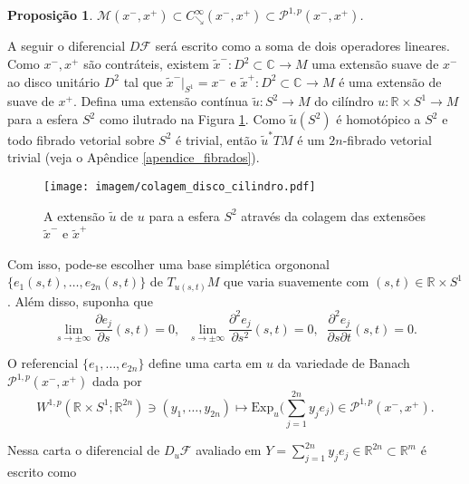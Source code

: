 \documentclass[12pt]{book}
\newtheorem{proposicao}[teorema]{Proposição}
\newcommand{\caminhosdecaimentoexponencial}[2]{C^{\infty}_{\searrow}(#1, #2)}
\newcommand{\caminhosdecaimentoexponencialpadrao}{\caminhosdecaimentoexponencial{x^{-}}{x^{+}}}
\newcommand{\caminhosexponenciaisconectantes}[2]{\mathcal{P}^{1,p}(#1, #2)}
\newcommand{\caminhosexponenciaisconectantespadrao}{\caminhosexponenciaisconectantes{x^{-}}{x^{+}}}
\newcommand{\circulo}{S^{1}}
\newcommand{\complexo}[1]{\mathbb{C}^{#1}}
\newcommand{\diferencialfloer}{D\operadorFloer}
\newcommand{\diferencialfloerponto}[1]{D_{#1}\operadorFloer}
\newcommand{\derivadaparcial}[2]{\frac{\partial #1}{\partial #2}}
\newcommand{\energiafinitaM}{\mathcal{M}}
\newcommand{\energiafinitaMconectante}{\energiafinitaM(x^{-}, x^{+})}
\newcommand{\espacosobolevcontradominio}[2]{W^{1,p}(#1;#2)}
\newcommand{\espacotangenteponto}[2]{T_{#1}#2}
\newcommand{\Exp}{\text{Exp}}
\newcommand{\operadorFloer}{\mathcal{F}}
\newcommand{\pullbackfibradotangente}[2]{#1^{*}T#2}
\newcommand{\pullbackfibradotangenteM}[1]{\pullbackfibradotangente{#1}{M}}
\newcommand{\retacartesianocirculo}{\real{} \times \circulo}
\newcommand{\real}[1]{\mathbb{R}^{#1}}
\begin{document}
	\begin{proposicao}\label{proposicao_cadeia_caminhos_conectantes}
		$\energiafinitaMconectante \subset \caminhosdecaimentoexponencialpadrao \subset  \caminhosexponenciaisconectantespadrao$.
	\end{proposicao}
	
	
	A seguir o diferencial $\diferencialfloer$ será escrito como a soma de dois operadores lineares. Como $x^{-}, x^{+}$ são contráteis, existem $\tilde{x}^{-}:D^{2}\subset \complexo{} \to M$ uma extensão suave de $x^{-}$ ao disco unitário $D^{2}$ tal que  $\tilde{x}^{-}|_{\circulo} = x^{-}$ e $\tilde{x}^{+}:D^{2}\subset \complexo{} \to M$ é uma extensão de suave de $x^{+}$. Defina uma extensão contínua $\tilde{u}:S^{2}\to M$ do cilíndro $u:\retacartesianocirculo\to M$ para a esfera $S^{2}$ como ilutrado na Figura \ref{figura_colagem_disco_cilindro}. Como $\tilde{u}(S^{2})$ é homotópico a $S^{2}$ e todo fibrado vetorial sobre $S^{2}$ é trivial, então $\pullbackfibradotangenteM{\tilde{u}}$ é um $2n$-fibrado vetorial trivial (veja o Apêndice \ref{apendice_fibrados}).
	
	\begin{figure}[!h]
		\centering
		\texttt{[image: imagem/colagem\_disco\_cilindro.pdf]}
		\caption{A extensão $\tilde{u}$ de $u$ para a esfera $S^{2}$ através da colagem das extensões $\tilde{x}^{-}$ e $\tilde{x}^{+}$}
		\label{figura_colagem_disco_cilindro}
	\end{figure}
	
	Com isso, pode-se escolher uma base simplética orgononal $\{e_{1}(s,t), \dots, e_{2n}(s,t)\}$ de $\espacotangenteponto{u(s,t)}{M}$ que varia suavemente com $(s,t)\in \retacartesianocirculo$. Além disso, suponha que
	$$
	\lim\limits_{s\to \pm \infty}\derivadaparcial{e_{j}}{s}(s,t)=0,\;\;	\lim\limits_{s\to \pm \infty}\frac{\partial^{2}e_{j}}{\partial s^{2}}(s,t)=0,\;\;\frac{\partial^{2}e_{j}}{\partial s \partial t}(s,t)=0.
	$$
	
	O referencial $\{e_{1}, \dots, e_{2n}\}$ define uma carta em $u$ da variedade de Banach $\caminhosexponenciaisconectantespadrao$ dada por
	$$
	\espacosobolevcontradominio{\retacartesianocirculo}{\real{2n}} \ni (y_{1}, \dots ,y_{2n})\mapsto \Exp_{u}\Big(\sum_{j=1}^{2n}y_{j}e_{j}\Big) \in \caminhosexponenciaisconectantespadrao.
	$$
	
	Nessa carta o diferencial de $\diferencialfloerponto{u}$ avaliado em $Y=\sum_{j=1}^{2n}y_{j}e_{j} \in \real{2n} \subset \real{m}$ é escrito como
	
\end{document}
